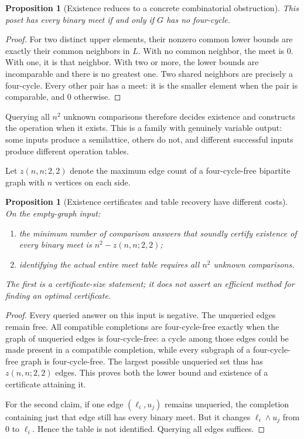 \documentclass[11pt]{article}
\newtheorem{proposition}[theorem]{Proposition}
\theoremstyle{remark}
\begin{document}
\begin{proposition}[Existence reduces to a concrete combinatorial obstruction]
\label{prop:c4}
This poset has every binary meet if and only if $G$ has no four-cycle.
\end{proposition}
\begin{proof}
For two distinct upper elements, their nonzero common lower bounds are exactly their common neighbors in $L$. With no common neighbor, the meet is $0$. With one, it is that neighbor. With two or more, the lower bounds are incomparable and there is no greatest one. Two shared neighbors are precisely a four-cycle. Every other pair has a meet: it is the smaller element when the pair is comparable, and $0$ otherwise.
\end{proof}

Querying all $n^2$ unknown comparisons therefore decides existence and constructs the operation when it exists. This is a family with genuinely variable output: some inputs produce a semilattice, others do not, and different successful inputs produce different operation tables.

Let $z(n,n;2,2)$ denote the maximum edge count of a four-cycle-free bipartite graph with $n$ vertices on each side.

\begin{proposition}[Existence certificates and table recovery have different costs]
\label{prop:cost}
On the empty-graph input:
\begin{enumerate}
\item the minimum number of comparison answers that soundly certify existence of every binary meet is $n^2-z(n,n;2,2)$;
\item identifying the actual entire meet table requires all $n^2$ unknown comparisons.
\end{enumerate}
The first is a certificate-size statement; it does not assert an efficient method for finding an optimal certificate.
\end{proposition}
\begin{proof}
Every queried answer on this input is negative. The unqueried edges remain free. All compatible completions are four-cycle-free exactly when the graph of unqueried edges is four-cycle-free: a cycle among those edges could be made present in a compatible completion, while every subgraph of a four-cycle-free graph is four-cycle-free. The largest possible unqueried set thus has $z(n,n;2,2)$ edges. This proves both the lower bound and existence of a certificate attaining it.

For the second claim, if one edge $(\ell_i,u_j)$ remains unqueried, the completion containing just that edge still has every binary meet. But it changes $\ell_i\wedge u_j$ from $0$ to $\ell_i$. Hence the table is not identified. Querying all edges suffices.
\end{proof}
\end{document}
